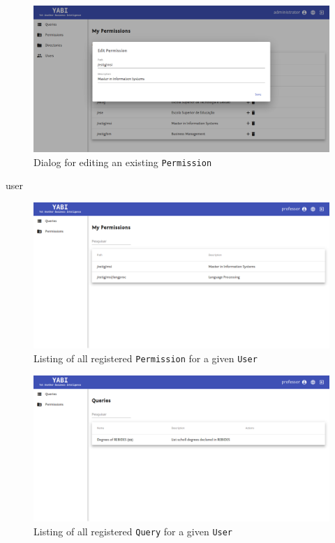 \begin{figure}
  \centering
  \includegraphics[width=.8\textwidth]{images/screenshots/permission/permission-edit}
  \caption{Dialog for editing an existing \texttt{Permission}}\label{fig:permissionedit}
\end{figure}


user
\begin{figure}
  \centering
  \includegraphics[width=.8\textwidth]{images/screenshots/user/user-permission-listing}
  \caption{Listing of all registered \texttt{Permission} for a given \texttt{User}}\label{fig:userpermisisonlist}
\end{figure}

\begin{figure}
  \centering
  \includegraphics[width=.8\textwidth]{images/screenshots/user/user-query-listing}
  \caption{Listing of all registered \texttt{Query} for a given \texttt{User}}\label{fig:userquerylist}
\end{figure}


